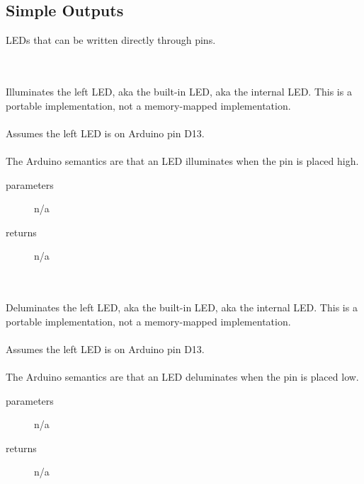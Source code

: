\subsection{Simple Outputs}\label{subsec:SimpleOutputs}

    LEDs that can be written directly through pins.

    \begin{itemize}
         \\ \\
            Illuminates the left LED, aka the built-in LED, aka the internal LED\@.
            This is a portable implementation, not a memory-mapped implementation. \\ \\
            Assumes the left LED is on Arduino pin D13. \\ \\
            The Arduino semantics are that an LED illuminates when the pin is placed high.
            \begin{description}
                \item[parameters] n/a
                \item[returns] n/a
            \end{description}

         \\ \\
            Deluminates the left LED, aka the built-in LED, aka the internal LED\@.
            This is a portable implementation, not a memory-mapped implementation. \\ \\
            Assumes the left LED is on Arduino pin D13. \\ \\
            The Arduino semantics are that an LED deluminates when the pin is placed low.
            \begin{description}
                \item[parameters] n/a
                \item[returns] n/a
            \end{description}


\end{itemize}
